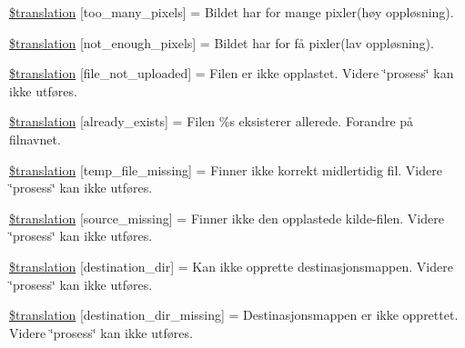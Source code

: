\begin{DoxyCompactItemize}
\item 
\hyperlink{class_8upload_8no___n_o_8php_aa4051ef64e94a3f8295c63cf85544016}{\$translation} \mbox{[}\textquotesingle{}too\+\_\+many\+\_\+pixels\textquotesingle{}\mbox{]} = \textquotesingle{}Bildet har for mange pixler(høy oppløsning).\textquotesingle{}
\item 
\hyperlink{class_8upload_8no___n_o_8php_a1fe342c27ce61f4ff4e0120ba647033e}{\$translation} \mbox{[}\textquotesingle{}not\+\_\+enough\+\_\+pixels\textquotesingle{}\mbox{]} = \textquotesingle{}Bildet har for få pixler(lav oppløsning).\textquotesingle{}
\item 
\hyperlink{class_8upload_8no___n_o_8php_a4ce76e7be0b3a03c2b47f6d70c21832e}{\$translation} \mbox{[}\textquotesingle{}file\+\_\+not\+\_\+uploaded\textquotesingle{}\mbox{]} = \textquotesingle{}Filen er ikke opplastet. Videre \char`\"{}prosess\char`\"{} kan ikke utføres.\textquotesingle{}
\item 
\hyperlink{class_8upload_8no___n_o_8php_afd84e910217f04139f567c41e292afa5}{\$translation} \mbox{[}\textquotesingle{}already\+\_\+exists\textquotesingle{}\mbox{]} = \textquotesingle{}Filen \%s eksisterer allerede. Forandre på filnavnet.\textquotesingle{}
\item 
\hyperlink{class_8upload_8no___n_o_8php_ab0fa87a88aba2624004581eed0633325}{\$translation} \mbox{[}\textquotesingle{}temp\+\_\+file\+\_\+missing\textquotesingle{}\mbox{]} = \textquotesingle{}Finner ikke korrekt midlertidig fil. Videre \char`\"{}prosess\char`\"{} kan ikke utføres.\textquotesingle{}
\item 
\hyperlink{class_8upload_8no___n_o_8php_aceaaf7355acaaf10f0ae60378d03c468}{\$translation} \mbox{[}\textquotesingle{}source\+\_\+missing\textquotesingle{}\mbox{]} = \textquotesingle{}Finner ikke den opplastede kilde-\/filen. Videre \char`\"{}prosess\char`\"{} kan ikke utføres.\textquotesingle{}
\item 
\hyperlink{class_8upload_8no___n_o_8php_aff2427c72a2598aefa6d58df1dd18b08}{\$translation} \mbox{[}\textquotesingle{}destination\+\_\+dir\textquotesingle{}\mbox{]} = \textquotesingle{}Kan ikke opprette destinasjonsmappen. Videre \char`\"{}prosess\char`\"{} kan ikke utføres.\textquotesingle{}
\item 
\hyperlink{class_8upload_8no___n_o_8php_a9ef28d3cf09942c6c0a1e77fa09185e8}{\$translation} \mbox{[}\textquotesingle{}destination\+\_\+dir\+\_\+missing\textquotesingle{}\mbox{]} = \textquotesingle{}Destinasjonsmappen er ikke opprettet. Videre \char`\"{}prosess\char`\"{} kan ikke utføres.\textquotesingle{}

\end{DoxyCompactItemize}
